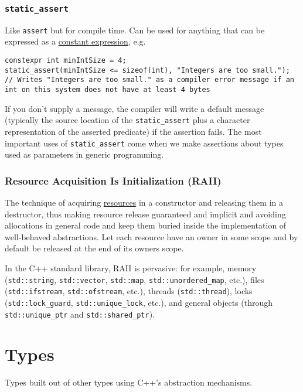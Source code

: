 \documentclass[8pt, table, xcdraw]{article}%
\begin{document}
\subsubsection{\lstinline{static_assert}} \label{static_assert}
Like \lstinline{assert} but for compile time. Can be used for anything that can be expressed as a \hyperref[constexpr]{constant expression}, e.g.

\begin{lstlisting}
constexpr int minIntSize = 4;
static_assert(minIntSize <= sizeof(int), "Integers are too small."); // Writes "Integers are too small." as a compiler error message if an int on this system does not have at least 4 bytes
\end{lstlisting}

If you don't supply a message, the compiler will write a default message (typically the source location of the \lstinline{static_assert} plus a character representation of the asserted predicate) if the assertion fails. The most important uses of \lstinline{static_assert} come when we make assertions  about types used as parameters in generic programming.

\subsubsection{Resource  Acquisition  Is  Initialization (RAII)}
The technique of acquiring \hyperref[resource]{resources} in a constructor and releasing them in a destructor, thus making resource release guaranteed and implicit and avoiding allocations in general code and keep them buried inside the implementation of well-behaved abstractions. Let each resource have an owner in some scope and by default be released at the end of its owners scope.

In the C++ standard library, RAII is pervasive: for example, memory (\lstinline{std::string}, \lstinline{std::vector}, \lstinline{std::map}, \lstinline{std::unordered_map}, etc.), files (\lstinline{std::ifstream}, \lstinline{std::ofstream}, etc.), threads (\lstinline{std::thread}), locks (\lstinline{std::lock_guard}, \lstinline{std::unique_lock}, etc.), and general objects (through \lstinline{std::unique_ptr} and \lstinline{std::shared_ptr}).

\section{Types}

Types built out of other types using C++'s abstraction mechanisms.
\end{document}
